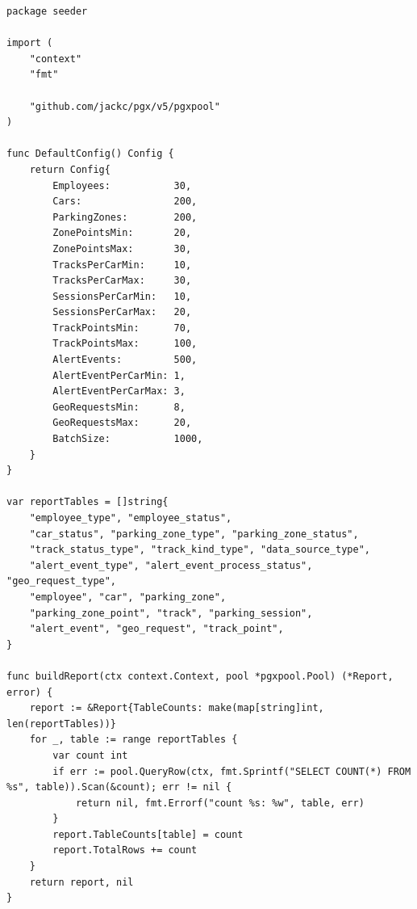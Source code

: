 \begin{lstlisting}[style=gostyle, caption={Конфигурация и отчёт сидера (internal/seeder/config.go)}, label={lst:goSeederConfig}]
package seeder

import (
	"context"
	"fmt"

	"github.com/jackc/pgx/v5/pgxpool"
)

func DefaultConfig() Config {
	return Config{
		Employees:           30,
		Cars:                200,
		ParkingZones:        200,
		ZonePointsMin:       20,
		ZonePointsMax:       30,
		TracksPerCarMin:     10,
		TracksPerCarMax:     30,
		SessionsPerCarMin:   10,
		SessionsPerCarMax:   20,
		TrackPointsMin:      70,
		TrackPointsMax:      100,
		AlertEvents:         500,
		AlertEventPerCarMin: 1,
		AlertEventPerCarMax: 3,
		GeoRequestsMin:      8,
		GeoRequestsMax:      20,
		BatchSize:           1000,
	}
}

var reportTables = []string{
	"employee_type", "employee_status",
	"car_status", "parking_zone_type", "parking_zone_status",
	"track_status_type", "track_kind_type", "data_source_type",
	"alert_event_type", "alert_event_process_status", "geo_request_type",
	"employee", "car", "parking_zone",
	"parking_zone_point", "track", "parking_session",
	"alert_event", "geo_request", "track_point",
}

func buildReport(ctx context.Context, pool *pgxpool.Pool) (*Report, error) {
	report := &Report{TableCounts: make(map[string]int, len(reportTables))}
	for _, table := range reportTables {
		var count int
		if err := pool.QueryRow(ctx, fmt.Sprintf("SELECT COUNT(*) FROM %s", table)).Scan(&count); err != nil {
			return nil, fmt.Errorf("count %s: %w", table, err)
		}
		report.TableCounts[table] = count
		report.TotalRows += count
	}
	return report, nil
}
\end{lstlisting}
\newpage

